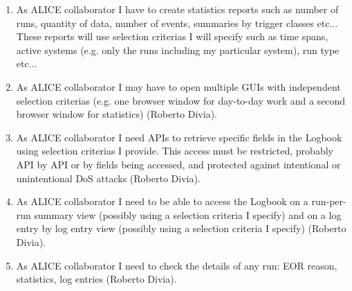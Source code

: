 \begin{enumerate}
  \item As ALICE collaborator I have to create statistics reports such as number of runs, quantity of data, number of events, summaries by trigger classes etc... These reports will use selection criterias I will specify such as time spans, active systems (e.g. only the runs including my particular system), run type etc...
\item As ALICE collaborator I may have to open multiple GUIs with independent selection criterias (e.g. one browser window for day-to-day work and a second browser window for statistics) (Roberto Divia).
\item As ALICE collaborator I need APIs to retrieve specific fields in the Logbook using selection criterias I provide. This access must be restricted, probably API by API or by fields being accessed, and protected against intentional or unintentional DoS attacks (Roberto Divia).
\item As ALICE collaborator I need to be able to access the Logbook on a run-per-run summary view (possibly using a selection criteria I specify) and on a log entry by log entry view (possibly using a selection criteria I specify) (Roberto Divia).
\item As ALICE collaborator I need to check the details of any run: EOR reason, statistics, log entries (Roberto Divia).
\end{enumerate}

